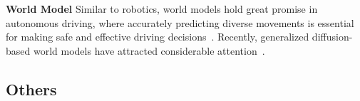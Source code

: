 \noindent\textbf{World Model} Similar to robotics, world models hold great promise in autonomous driving, where accurately predicting diverse movements is essential for making safe and effective driving decisions~\citep{feng2025survey}. Recently, generalized diffusion-based world models have attracted considerable attention~\citep{chen2024drivinggpt}.

\subsection{Others}

